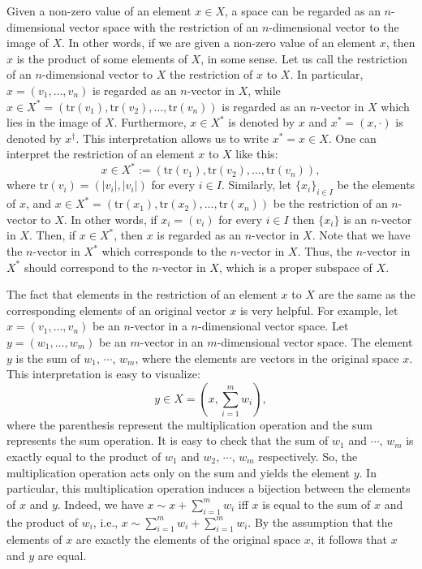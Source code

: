 \documentclass[a4paper,reqno,oneside]{article}
\begin{document}
Given a non-zero value of an element $x\in X$, a space can be regarded as an $n$-dimensional vector space with the restriction of an $n$-dimensional vector to the image of $X$. In other words, if we are given a non-zero value of an element $x$, then $x$ is the product of some elements of $X$, in some sense. Let us call the restriction of an $n$-dimensional vector to $X$ the restriction of $x$ to $X$.  In particular, $x=(v_1,\ldots,v_n)$ is regarded as an $n$-vector in $X$, while $x\in X^*=(\mathrm{tr}(v_1),\mathrm{tr}(v_2),\ldots,\mathrm{tr}(v_n))$ is regarded as an $n$-vector in $X$ which lies in the image of $X$. Furthermore, $x\in X^*$ is denoted by $x$ and $x^*=(x,\cdot)$ is denoted by $x^\dagger$. This interpretation allows us to write $x^*=x\in X$.  One can interpret the restriction of an element $x$ to $X$ like this: 
$$x\in X^* :=\left(\mathrm{tr}(v_1),\mathrm{tr}(v_2),\ldots,\mathrm{tr}(v_n)\right), $$
where $\mathrm{tr}(v_i)=(|v_i|, |v_i|)$ for every $i\in I$. Similarly, let $\{x_i\}_{i\in I}$ be the elements of $x$, and $x\in X^{*}=(\mathrm{tr}(x_1),\mathrm{tr}(x_2),\ldots,\mathrm{tr}(x_n))$ be the restriction of an $n$-vector to $X$. In other words, if $x_i=(v_i)$ for every $i\in I$ then $\{x_i\}$ is an $n$-vector in $X$. Then, if $x\in X^{*}$, then $x$ is regarded as an $n$-vector in $X$.  Note that we have the $n$-vector in $X^*$ which corresponds to the $n$-vector in $X$. Thus, the $n$-vector in $X^*$ should correspond to the $n$-vector in $X$, which is a proper subspace of $X$. 


The fact that elements in the restriction of an element $x$ to $X$ are the same as the corresponding elements of an original vector $x$ is very helpful. For example, let $x=(v_1,\ldots,v_n)$ be an $n$-vector in a $n$-dimensional vector space. Let $y=(w_1,\ldots,w_m)$ be an $m$-vector in an $m$-dimensional vector space. The element $y$ is the sum of $w_1$, $\cdots$, $w_m$, where the elements are vectors in the original space $x$. This interpretation is easy to visualize: 
$$ y\in X = (x,\sum_{i=1}^m w_i),$$
where the parenthesis represent the multiplication operation and the sum represents the sum operation. It is easy to check that the sum of $w_1$ and $\cdots$, $w_m$ is exactly equal to the product of $w_1$ and $w_2$, $\cdots$, $w_m$ respectively. So, the multiplication operation acts only on the sum and yields the element $y$.  In particular, this multiplication operation induces a bijection between the elements of $x$ and $y$. Indeed, we have $x\sim x+\sum_{i=1}^m w_i$ iff $x$ is equal to the sum of $x$ and the product of $w_i$, i.e., $x\sim \sum_{i=1}^m w_i+\sum_{i=1}^m w_i$. By the assumption that the elements of $x$ are exactly the elements of the original space $x$, it follows that $x$ and $y$ are equal.
\end{document}
